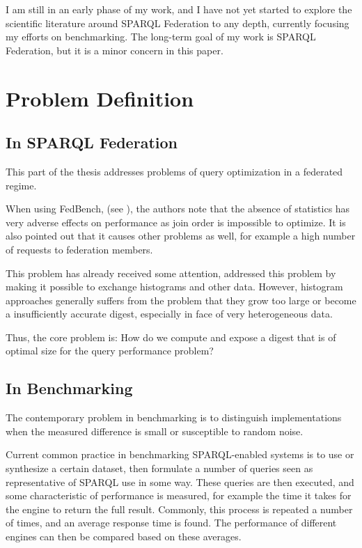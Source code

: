 \documentclass{llncs}
\begin{document}
I am still in an early phase of my work, and I have not yet started to
explore the scientific literature around SPARQL Federation to any
depth, currently focusing my efforts on benchmarking. The long-term
goal of my work is SPARQL Federation, but it is a minor concern in
this paper.

\section{Problem Definition}

\subsection{In SPARQL Federation}

This part of the thesis addresses problems of query optimization in a
federated regime.

When using FedBench, (see \cite{Schmidt:2011:FBS:2063016.2063054}),
the authors note that the absence of statistics has very adverse
effects on performance as join order is impossible to optimize. It is
also pointed out that it causes other problems as well, for example a
high number of requests to federation members. 

This problem has already received some attention, \cite{5337556}
addressed this problem by making it possible to exchange histograms
and other data. However, histogram approaches generally suffers from
the problem that they grow too large or become a insufficiently
accurate digest, especially in face of very heterogeneous data.

Thus, the core problem is: How do we compute and expose a digest that
is of optimal size for the query performance problem?

\subsection{In Benchmarking}

The contemporary problem in benchmarking is to distinguish
implementations when the measured difference is small or susceptible
to random noise.

Current common practice in benchmarking SPARQL-enabled systems is to
use or synthesize a certain dataset, then formulate a number of
queries seen as representative of SPARQL use in some way. These
queries are then executed, and some characteristic of performance is
measured, for example the time it takes for the engine to return the
full result. Commonly, this process is repeated a number of times, and
an average response time is found. The performance of different
engines can then be compared based on these averages.
\end{document}

